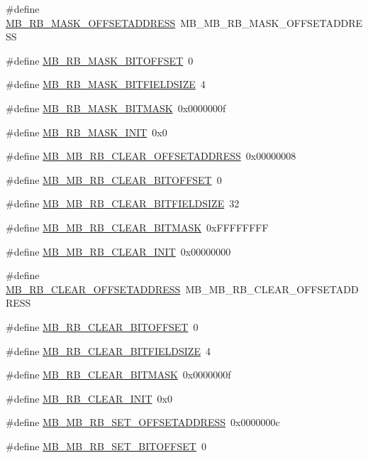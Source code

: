 \begin{DoxyCompactItemize}
\item 
\#define \hyperlink{a00562_a7004e3d77b0ac9010769868c101d3350}{MB\_\-RB\_\-MASK\_\-OFFSETADDRESS}~MB\_\-MB\_\-RB\_\-MASK\_\-OFFSETADDRESS
\item 
\#define \hyperlink{a00562_ab3eeb3c34f259a44c98411bcd37e45e4}{MB\_\-RB\_\-MASK\_\-BITOFFSET}~0
\item 
\#define \hyperlink{a00562_a37c8bea70172d8bcebc6e6a8fe2fee27}{MB\_\-RB\_\-MASK\_\-BITFIELDSIZE}~4
\item 
\#define \hyperlink{a00562_a3d5c1db480746dfeb075fae64423981d}{MB\_\-RB\_\-MASK\_\-BITMASK}~0x0000000f
\item 
\#define \hyperlink{a00562_a848d6aa4804d662e99117a47ec5bee49}{MB\_\-RB\_\-MASK\_\-INIT}~0x0
\item 
\#define \hyperlink{a00562_af6920db3f8dde109c74c9dee03860512}{MB\_\-MB\_\-RB\_\-CLEAR\_\-OFFSETADDRESS}~0x00000008
\item 
\#define \hyperlink{a00562_abb535dba1828969b23228aa6991ce47d}{MB\_\-MB\_\-RB\_\-CLEAR\_\-BITOFFSET}~0
\item 
\#define \hyperlink{a00562_aa802d89f024427994066231091cb66c8}{MB\_\-MB\_\-RB\_\-CLEAR\_\-BITFIELDSIZE}~32
\item 
\#define \hyperlink{a00562_aa4a5385412175d539d7f8ce01ee0eeff}{MB\_\-MB\_\-RB\_\-CLEAR\_\-BITMASK}~0xFFFFFFFF
\item 
\#define \hyperlink{a00562_aadc0006d23637e83c4378dc006d4f37f}{MB\_\-MB\_\-RB\_\-CLEAR\_\-INIT}~0x00000000
\item 
\#define \hyperlink{a00562_ab00de450f30c14ea5d1cfc486c6b4f61}{MB\_\-RB\_\-CLEAR\_\-OFFSETADDRESS}~MB\_\-MB\_\-RB\_\-CLEAR\_\-OFFSETADDRESS
\item 
\#define \hyperlink{a00562_a5e74d3b4b210d12c9cd2b605ec203de2}{MB\_\-RB\_\-CLEAR\_\-BITOFFSET}~0
\item 
\#define \hyperlink{a00562_aa9c7244295decd35621bbcfcd69881c2}{MB\_\-RB\_\-CLEAR\_\-BITFIELDSIZE}~4
\item 
\#define \hyperlink{a00562_acc555723a072b67e9f55dff986ad966b}{MB\_\-RB\_\-CLEAR\_\-BITMASK}~0x0000000f
\item 
\#define \hyperlink{a00562_a76e2b46980100bd792f1578a996ca948}{MB\_\-RB\_\-CLEAR\_\-INIT}~0x0
\item 
\#define \hyperlink{a00562_ad21159537ea6e9cdc0da9ba58c720d7a}{MB\_\-MB\_\-RB\_\-SET\_\-OFFSETADDRESS}~0x0000000c
\item 
\#define \hyperlink{a00562_aecc5326021f2787ca6d14f839a6df050}{MB\_\-MB\_\-RB\_\-SET\_\-BITOFFSET}~0

\end{DoxyCompactItemize}

